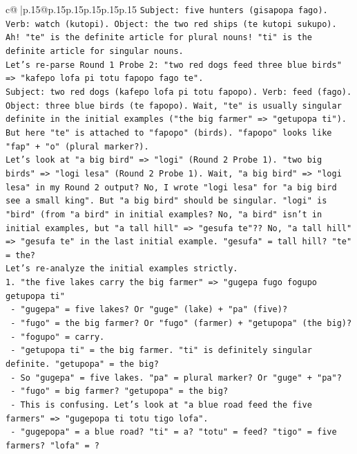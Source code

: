 \documentclass{article}
\begin{document}
{\begin{supertabular}{c@{$\;$}|p{.15\linewidth}@{}p{.15\linewidth}p{.15\linewidth}p{.15\linewidth}p{.15\linewidth}p{.15\linewidth}}
{{{\texttt{Subject: five hunters (gisapopa fago). Verb: watch (kutopi). Object: the two red ships (te kutopi sukupo).} \\
\texttt{Ah! "te" is the definite article for plural nouns! "ti" is the definite article for singular nouns.} \\
\texttt{Let's re{-}parse Round 1 Probe 2: "two red dogs feed three blue birds" => "kafepo lofa pi totu fapopo fago te".} \\
\texttt{Subject: two red dogs (kafepo lofa pi totu fapopo). Verb: feed (fago). Object: three blue birds (te fapopo). Wait, "te" is usually singular definite in the initial examples ("the big farmer" => "getupopa ti"). But here "te" is attached to "fapopo" (birds). "fapopo" looks like "fap" + "o" (plural marker?).} \\
\texttt{Let's look at "a big bird" => "logi" (Round 2 Probe 1). "two big birds" => "logi lesa" (Round 2 Probe 1). Wait, "a big bird" => "logi lesa" in my Round 2 output? No, I wrote "logi lesa" for "a big bird see a small king". But "a big bird" should be singular. "logi" is "bird" (from "a bird" in initial examples? No, "a bird" isn't in initial examples, but "a tall hill" => "gesufa te"?? No, "a tall hill" => "gesufa te" in the last initial example. "gesufa" = tall hill? "te" = the?} \\
\texttt{Let's re{-}analyze the initial examples strictly.} \\
\texttt{1. "the five lakes carry the big farmer" => "gugepa fugo fogupo getupopa ti"} \\
\texttt{   {-} "gugepa" = five lakes? Or "guge" (lake) + "pa" (five)?} \\
\texttt{   {-} "fugo" = the big farmer? Or "fugo" (farmer) + "getupopa" (the big)?} \\
\texttt{   {-} "fogupo" = carry.} \\
\texttt{   {-} "getupopa ti" = the big farmer. "ti" is definitely singular definite. "getupopa" = the big?} \\
\texttt{   {-} So "gugepa" = five lakes. "pa" = plural marker? Or "guge" + "pa"?} \\
\texttt{   {-} "fugo" = big farmer? "getupopa" = the big?} \\
\texttt{   {-} This is confusing. Let's look at "a blue road feed the five farmers" => "gugepopa ti totu tigo lofa".} \\
\texttt{   {-} "gugepopa" = a blue road? "ti" = a? "totu" = feed? "tigo" = five farmers? "lofa" = ?} \\
}}}
\end{supertabular}}
\end{document}
